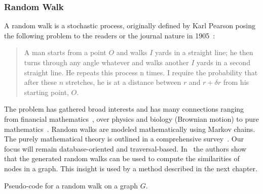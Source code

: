             \subsubsection*{Random Walk}\label{rand-w}
                A random walk is a stochastic process, originally defined by Karl Pearson posing the following problem to the readers or the journal nature in 1905~\autocite{pearson1905problem}: 
                \begin{quote}
                    A man starts from a point $O$ and walks $I$ yards in a straight line; he then turns through any angle whatever and walks another $I$ yards in a second straight line. 
                    He repeats this process n times. 
                    I require the probability that after these $n$ stretches, he is at a distance between $r$ and $r + \delta r$ from his starting point, $O$.
                \end{quote}
                The problem has gathered broad interests and has many connections ranging from financial mathematics~\autocite{bachelier1900theorie}, over physics and biology (Brownian motion\autocite{brown1828xxvii}) to pure mathematics~\autocite{wiener1976collected}. 
                Random walks are modeled mathematically using Markov chains.            
                The purely mathematical theory is outlined in a comprehensive survey~\autocite{lovasz1993random}. 
                Our focus will remain database-oriented and traversal-based.
                In~\autocite{fouss2007random} the authors show that the generated random walks can be used to compute the similarities of nodes in a graph. 
                This insight is used by a method described in the next chapter.
                
                \begin{algorithm}[htp]
                    \hrulealg
                \caption{Pseudo-code for a random walk on a graph $G$.}\label{random_walk}
                \end{algorithm}
                
